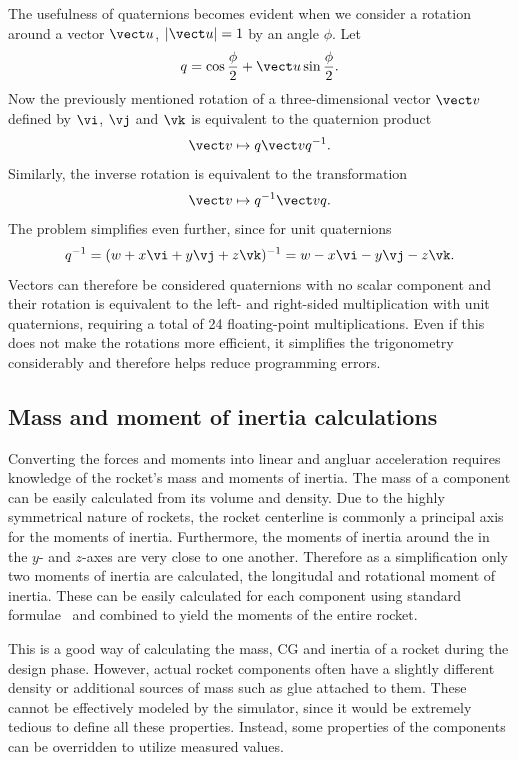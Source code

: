 The usefulness of quaternions becomes evident when we consider a
rotation around a vector $\vect u$, $|\vect u|=1$ by an angle $\phi$.
Let
%
\begin{equation}
q = \cos\frac{\phi}{2} + \vect u \sin\frac{\phi}{2}.
\label{eq-rotation-quaternion}
\end{equation}
%
Now the previously mentioned rotation of a three-dimensional vector
$\vect v$ defined by $\vi$, $\vj$ and $\vk$ is equivalent to the
quaternion product
%
\begin{equation}
\vect v \mapsto q\vect v q^{-1}.
\end{equation}
%
Similarly, the inverse rotation is equivalent to the transformation
%
\begin{equation}
\vect v \mapsto q^{-1} \vect v q.
\end{equation}
%
The problem simplifies even further, since for unit quaternions
%
\begin{equation}
q^{-1} = (w + x\vi + y\vj + z\vk)^{-1} = w - x\vi - y\vj - z\vk.
\end{equation}
%
Vectors can therefore be considered quaternions with no scalar
component and their rotation is equivalent to the left- and right-sided
multiplication with unit quaternions, requiring a total of 24
floating-point multiplications.  Even if this does not make the
rotations more efficient, it simplifies the trigonometry considerably
and therefore helps reduce programming errors.


\subsection{Mass and moment of inertia calculations}
\label{sec-mass-inertia}

Converting the forces and moments into linear and angluar acceleration
requires knowledge of the rocket's mass and moments of inertia.  The
mass of a component can be easily calculated from its volume and
density.  Due to the highly symmetrical nature of rockets, the rocket
centerline is commonly a principal axis for the moments of inertia.
Furthermore, the moments of inertia around the in the $y$- and
$z$-axes are very close to one another.  Therefore as a simplification
only two moments of inertia are calculated, the longitudal and
rotational moment of inertia.  These can be easily calculated for each
component using standard formulae~\cite{wiki-moments-of-inertia} and
combined to yield the moments of the entire rocket.

This is a good way of calculating the mass, CG and inertia of a rocket
during the design phase.  However, actual rocket components often have
a slightly different density or additional sources of mass such as
glue attached to them.  These cannot be effectively modeled by the
simulator, since it would be extremely tedious to define all these
properties.  Instead, some properties of the components can be
overridden to utilize measured values.

